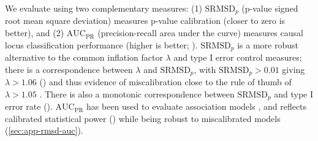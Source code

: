 \documentclass[9pt,lineno]{elife}
\newcommand{\rmsd}{\text{SRMSD}_p}
\newcommand{\auc}{\text{AUC}_\text{PR}}
\begin{document}
We evaluate using two complementary measures:
(1) $\rmsd$ (p-value signed root mean square deviation) measures p-value calibration (closer to zero is better), and
(2) $\auc$ (precision-recall area under the curve) measures causal locus classification performance (higher is better; ).
$\rmsd$ is a more robust alternative to the common inflation factor $\lambda$ and type I error control measures; there is a correspondence between $\lambda$ and $\rmsd$, with $\rmsd > 0.01$ giving $\lambda > 1.06$ () and thus evidence of miscalibration close to the rule of thumb of $\lambda > 1.05$ \citep{price_new_2010}.
There is also a monotonic correspondence between $\rmsd$ and type I error rate ().
$\auc$ has been used to evaluate association models \citep{rakitsch_lasso_2013}, and reflects calibrated statistical power () while being robust to miscalibrated models (\autoref{sec:app-rmsd-auc}).
\end{document}

